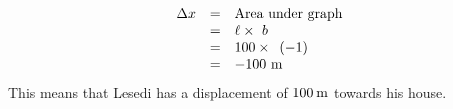     \begin{equation*}
    \begin{array}{ccc}\hfill \Delta x& =& \text{Area}\phantom{\rule{3.33333pt}{0ex}}\text{under}\phantom{\rule{3.33333pt}{0ex}}\text{graph}\hfill \\ & =& \ell \ensuremath{\times}\phantom{\rule{3.33333pt}{0ex}}b\hfill \\ & =& 100\ensuremath{\times}\phantom{\rule{3.33333pt}{0ex}}\left(-1\right)\hfill \\ & =& -100\phantom{\rule{3.33333pt}{0ex}}\text{m}\hfill \end{array}
      \end{equation*}
        \label{m38795*id71010}This means that Lesedi has a displacement of $100\phantom{\rule{2pt}{0ex}}\text{m}$ towards his house.\par 
\label{m38795*secfhsst!!!underscore!!!id2587}
